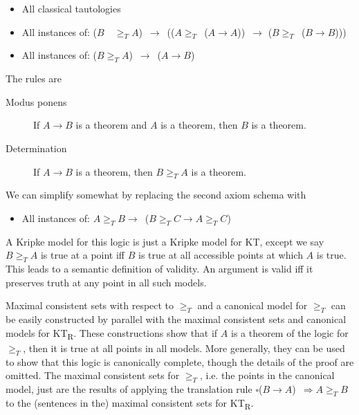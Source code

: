 \begin{itemize}
\item All classical tautologies
\item All instances of: (\(B\)~~\(\geqslant _T A\))~\(\rightarrow\)~((\(A \geqslant _T\)~(\(A \rightarrow A\)))~\(\rightarrow\) (\(B \geqslant _T\)~(\(B \rightarrow B\))))
\item All instances of: (\(B \geqslant _T A\))~\(\rightarrow\)~(\(A \rightarrow B\))
\end{itemize}

\noindent The rules are

\begin{description}
\item [Modus ponens] If \(A \rightarrow B\) is a theorem and \(A\) is a theorem, then \(B\) is a theorem.
\item [Determination] If \(A \rightarrow B\) is a theorem, then \(B \geqslant _T A\) is a theorem.
\end{description}

\noindent We can simplify somewhat by replacing the second axiom schema with

\begin{itemize}
\item All instances of: \(A \geqslant _T B \rightarrow\)~(\(B \geqslant _T C \rightarrow A \geqslant _T C\))
\end{itemize}

\noindent A Kripke model for this logic is just a Kripke model for KT, except we say \(B \geqslant _T A\) is true at a point iff \(B\) is true at all accessible points at which \(A\) is true. This leads to a semantic definition of validity. An argument is valid iff it preserves truth at any point in all such models. 

Maximal consistent sets with respect to \(\geqslant _T\) and a canonical model for \(\geqslant _T\) can be easily constructed by parallel with the maximal consistent sets and canonical models for KT\textsubscript{R}. These constructions show that if \(A\) is a theorem of the logic for \(\geqslant _T\), then it is true at all points in all models. More generally, they can be used to show that this logic is canonically complete, though the details of the proof are omitted. The maximal consistent sets for \(\geqslant _T\), i.e. the points in the canonical model, just are the results of applying the translation rule \(\square\)(\(B \rightarrow A\))~\(\Rightarrow A \geqslant _T B\) to the (sentences in the) maximal consistent sets for KT\textsubscript{R}.

